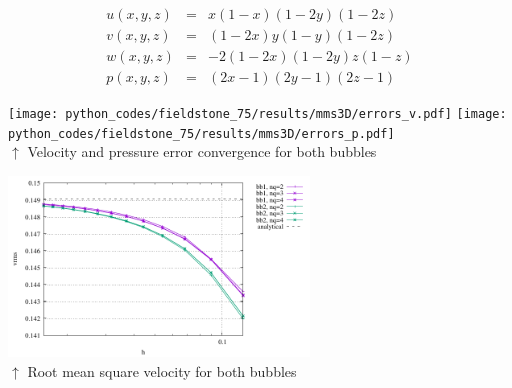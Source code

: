 \begin{eqnarray}
u(x,y,z) &=& x(1-x)(1-2y)(1-2z)\\
v(x,y,z) &=& (1-2x) y(1-y) (1-2z) \\
w(x,y,z) &=& -2(1-2x)(1-2y)z(1-z) \\
p(x,y,z) &=& (2x-1)(2y-1)(2z-1)
\end{eqnarray}

\begin{center}
\texttt{[image: python\_codes/fieldstone\_75/results/mms3D/errors\_v.pdf]}
\texttt{[image: python\_codes/fieldstone\_75/results/mms3D/errors\_p.pdf]}\\
{\captionfont $\uparrow$ Velocity and pressure error convergence for both bubbles}
\end{center}

\begin{center}
\includegraphics[width=8cm]{python_codes/fieldstone_75/results/mms3D/vrms.pdf}\\
{\captionfont $\uparrow$ Root mean square velocity for both bubbles}
\end{center}

